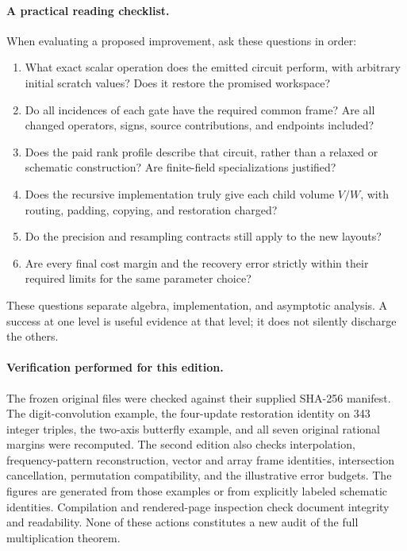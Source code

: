 \paragraph{A practical reading checklist.}
When evaluating a proposed improvement, ask these questions in order:
\begin{enumerate}
\item What exact scalar operation does the emitted circuit perform, with
arbitrary initial scratch values? Does it restore the promised workspace?
\item Do all incidences of each gate have the required common frame? Are
all changed operators, signs, source contributions, and endpoints included?
\item Does the paid rank profile describe that circuit, rather than a relaxed
or schematic construction? Are finite-field specializations justified?
\item Does the recursive implementation truly give each child volume $V/W$,
with routing, padding, copying, and restoration charged?
\item Do the precision and resampling contracts still apply to the new layouts?
\item Are every final cost margin and the recovery error strictly within
their required limits for the same parameter choice?
\end{enumerate}
These questions separate algebra, implementation, and asymptotic analysis.
A success at one level is useful evidence at that level; it does not silently
discharge the others.

\paragraph{Verification performed for this edition.}
The frozen original files were checked against their supplied SHA-256 manifest.
The digit-convolution example, the four-update restoration identity on 343
integer triples, the two-axis butterfly example, and all seven original
rational margins were recomputed. The second edition also checks interpolation,
frequency-pattern reconstruction, vector and array frame identities, intersection
cancellation, permutation compatibility, and the illustrative error budgets.
The figures are generated from those
examples or from explicitly labeled schematic identities. Compilation and
rendered-page inspection check document integrity and readability. None of
these actions constitutes a new audit of the full multiplication theorem.

